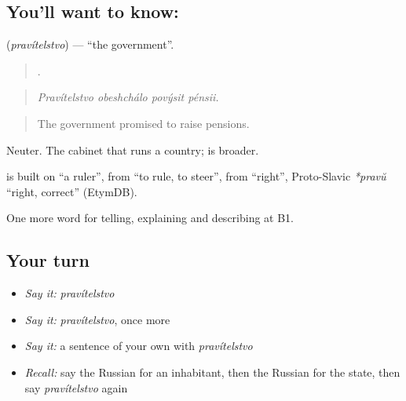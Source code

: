 \subsection*{You'll want to know: }
\textbf{} (\emph{pravítelstvo}) — \textquotedblleft{}the government\textquotedblright{}.

\begin{quote}
   .
\end{quote}

\begin{quote}
\emph{Pravítelstvo obeshchálo povýsit pénsii.}
\end{quote}

\begin{quote}
The government promised to raise pensions.
\end{quote}

Neuter. The cabinet that runs a country; \emph{} is broader.

\begin{cousinweb}
\textbf{} is built on \emph{} \textquotedblleft{}a ruler\textquotedblright{}, from \emph{} \textquotedblleft{}to rule, to steer\textquotedblright{}, from \emph{} \textquotedblleft{}right\textquotedblright{}, Proto-Slavic \emph{*pravŭ} \textquotedblleft{}right, correct\textquotedblright{} (EtymDB).
\end{cousinweb}

\begin{grammarlens}[title={What you've built}]
One more word for telling, explaining and describing at B1.
\end{grammarlens}

\subsection*{Your turn}
\begin{itemize}
\raggedright
  \item \emph{Say it:} \emph{pravítelstvo}
  \item \emph{Say it:} \emph{pravítelstvo}, once more
  \item \emph{Say it:} a sentence of your own with \emph{pravítelstvo}
  \item \emph{Recall:} say the Russian for an inhabitant, then the Russian for the state, then say \emph{pravítelstvo} again
\end{itemize}

